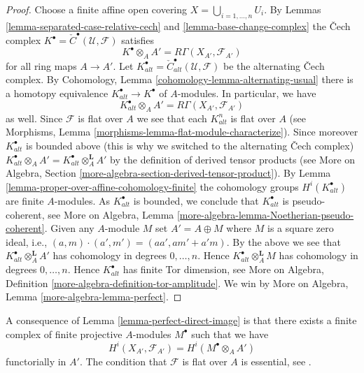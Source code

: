 \begin{proof}
Choose a finite affine open covering $X = \bigcup_{i = 1, \ldots, n} U_i$.
By Lemmas \ref{lemma-separated-case-relative-cech} and
\ref{lemma-base-change-complex} the {\v C}ech complex
$K^\bullet = {\check C}^\bullet(\mathcal{U}, \mathcal{F})$ satisfies
$$
K^\bullet \otimes_A A' = R\Gamma(X_{A'}, \mathcal{F}_{A'})
$$
for all ring maps $A \to A'$. Let
$K_{alt}^\bullet = {\check C}_{alt}^\bullet(\mathcal{U}, \mathcal{F})$
be the alternating {\v C}ech complex. By
Cohomology, Lemma \ref{cohomology-lemma-alternating-usual}
there is a homotopy equivalence $K_{alt}^\bullet \to K^\bullet$
of $A$-modules. In particular, we have
$$
K_{alt}^\bullet \otimes_A A' = R\Gamma(X_{A'}, \mathcal{F}_{A'})
$$
as well. Since $\mathcal{F}$ is flat over $A$ we see that each $K_{alt}^n$
is flat over $A$ (see
Morphisms, Lemma \ref{morphisms-lemma-flat-module-characterize}).
Since moreover $K_{alt}^\bullet$ is bounded above (this is why we switched
to the alternating {\v C}ech complex)
$K_{alt}^\bullet \otimes_A A' = K_{alt}^\bullet \otimes_A^{\mathbf{L}} A'$
by the definition of derived tensor products (see
More on Algebra, Section \ref{more-algebra-section-derived-tensor-product}).
By
Lemma \ref{lemma-proper-over-affine-cohomology-finite}
the cohomology groups $H^i(K_{alt}^\bullet)$ are finite $A$-modules.
As $K_{alt}^\bullet$ is bounded, we conclude that $K_{alt}^\bullet$
is pseudo-coherent, see
More on Algebra, Lemma \ref{more-algebra-lemma-Noetherian-pseudo-coherent}.
Given any $A$-module $M$ set $A' = A \oplus M$ where $M$ is a square zero
ideal, i.e., $(a, m) \cdot (a', m') = (aa', am' + a'm)$. By the
above we see that $K_{alt}^\bullet \otimes_A^\mathbf{L} A'$ has cohomology
in degrees $0, \ldots, n$. Hence $K_{alt}^\bullet \otimes_A^\mathbf{L} M$
has cohomology in degrees $0, \ldots, n$. Hence $K_{alt}^\bullet$ has
finite Tor dimension, see
More on Algebra, Definition \ref{more-algebra-definition-tor-amplitude}.
We win by More on Algebra, Lemma \ref{more-algebra-lemma-perfect}.
\end{proof}

\begin{remark}
\label{remark-explain-perfect-direct-image}
A consequence of Lemma \ref{lemma-perfect-direct-image} is that there
exists a finite complex of finite projective $A$-modules $M^\bullet$ such
that we have
$$
H^i(X_{A'}, \mathcal{F}_{A'}) = H^i(M^\bullet \otimes_A A')
$$
functorially in $A'$. The condition that $\mathcal{F}$ is
flat over $A$ is essential, see \cite{Hartshorne}.
\end{remark}





